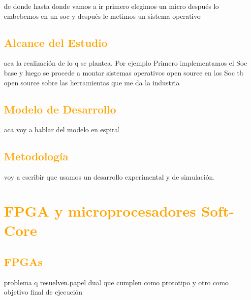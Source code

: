 \documentclass[a4paper,11pt]{article}
\begin{document}
de donde hasta donde vamos a ir
primero elegimos un micro después lo embebemos en un soc y después le metimos un sistema operativo

\subsection{\textcolor{orange}{Alcance del Estudio}}
aca la realización de lo q se plantea. Por ejemplo Primero implementamos el Soc base y luego se procede a montar sistemas operativos open source  en los Soc tb open source sobre las herramientas que me da la industria 
\subsection{\textcolor{orange}{Modelo de Desarrollo}}
aca voy a hablar del modelo en espiral 
\subsection{\textcolor{orange}{Metodología}}
voy a escribir que usamos un desarrollo experimental y de simulación.


\section{\textcolor{orange}{FPGA y microprocesadores Soft-Core}}%
	\subsection{\textcolor{orange}{FPGAs}}
 problema q resuelven.papel dual que cumplen como prototipo y otro como objetivo final de ejecución 
\end{document}
